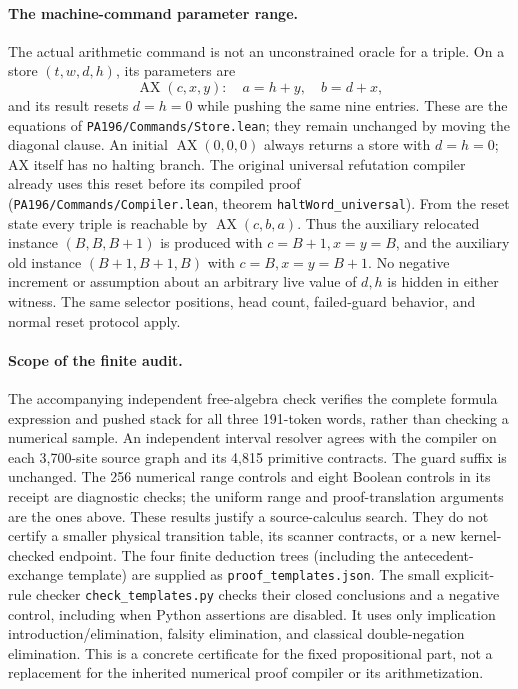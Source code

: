 \paragraph{The machine-command parameter range.}
The actual arithmetic command is not an unconstrained oracle for a triple.
On a store $(t,w,d,h)$, its parameters are
\[
 \operatorname{AX}(c,x,y):\quad a=h+y,\quad b=d+x,
\]
and its result resets $d=h=0$ while pushing the same nine entries.
These are the equations of \texttt{PA196/Commands/Store.lean}; they remain
unchanged by moving the diagonal clause.  An initial
$\operatorname{AX}(0,0,0)$ always returns a store with $d=h=0$; AX itself
has no halting branch.  The original universal refutation compiler already
uses this reset before its compiled proof
(\texttt{PA196/Commands/Compiler.lean}, theorem
\texttt{haltWord\_universal}).  From the reset state every triple is
reachable by $\operatorname{AX}(c,b,a)$.
Thus the auxiliary relocated instance $(B,B,B+1)$ is produced with
$c=B+1,x=y=B$, and the auxiliary old instance $(B+1,B+1,B)$ with
$c=B,x=y=B+1$.  No negative increment or assumption about an arbitrary
live value of $d,h$ is hidden in either witness.  The same selector positions,
head count, failed-guard behavior, and normal reset protocol apply.

\paragraph{Scope of the finite audit.}
The accompanying independent free-algebra check verifies the complete
formula expression and pushed stack for all three 191-token words, rather
than checking a numerical sample.  An independent interval resolver agrees
with the compiler on each 3,700-site source graph and its 4,815 primitive
contracts.  The guard suffix is unchanged.  The 256 numerical range controls
and eight Boolean controls in its receipt are diagnostic checks; the uniform
range and proof-translation arguments are the ones above.  These results
justify a source-calculus search.  They do not certify a smaller physical
transition table, its scanner contracts, or a new kernel-checked endpoint.
The four finite deduction trees (including the antecedent-exchange template)
are supplied as \texttt{proof\_templates.json}.  The small explicit-rule
checker \texttt{check\_templates.py} checks their closed conclusions and a
negative control, including when Python assertions are disabled.  It uses
only implication introduction/elimination, falsity elimination, and classical
double-negation elimination.  This is a concrete certificate for the fixed
propositional part, not a replacement for the inherited numerical proof
compiler or its arithmetization.
